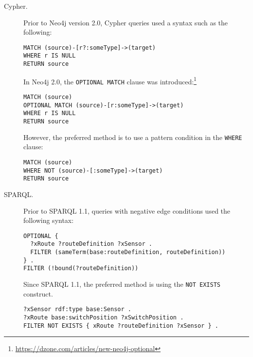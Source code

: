 \begin{description}
\item[Cypher.]
Prior to Neo4j version 2.0, Cypher queries used a syntax such as the following:

\begin{minipage}{\linewidth}
\begin{lstlisting}[language=cypher]
MATCH (source)-[r?:someType]->(target)
WHERE r IS NULL
RETURN source
\end{lstlisting}
\end{minipage}

In Neo4j 2.0, the \lstinline[language=cypher]{OPTIONAL MATCH} clause was introduced:\footnote{\url{https://dzone.com/articles/new-neo4j-optional}}

\begin{minipage}{\linewidth}
\begin{lstlisting}[language=cypher]
MATCH (source)
OPTIONAL MATCH (source)-[r:someType]->(target)
WHERE r IS NULL
RETURN source
\end{lstlisting}
\end{minipage}

However, the preferred method is to use a pattern condition in the \lstinline[language=cypher]{WHERE} clause:

\begin{minipage}{\linewidth}
\begin{lstlisting}[language=cypher]
MATCH (source)
WHERE NOT (source)-[:someType]->(target)
RETURN source
\end{lstlisting}
\end{minipage}

\item[SPARQL.]
Prior to SPARQL 1.1, queries with negative edge conditions used the following syntax:

\begin{minipage}{\linewidth}
\begin{lstlisting}[language=sparql]
OPTIONAL {
  ?xRoute ?routeDefinition ?xSensor .
  FILTER (sameTerm(base:routeDefinition, routeDefinition))
} .
FILTER (!bound(?routeDefinition))
\end{lstlisting}
\end{minipage}

Since SPARQL 1.1, the preferred method is using the \lstinline[language=sparql]{NOT EXISTS} construct.

\begin{minipage}{\linewidth}
\begin{lstlisting}[language=sparql]
?xSensor rdf:type base:Sensor .
?xRoute base:switchPosition ?xSwitchPosition .
FILTER NOT EXISTS { xRoute ?routeDefinition ?xSensor } .
\end{lstlisting}
\end{minipage}


\end{description}
